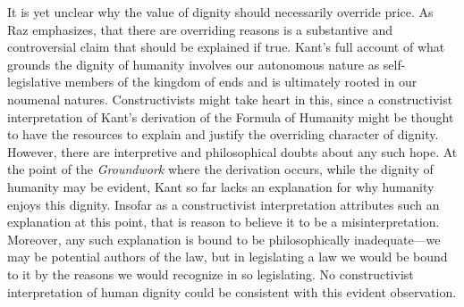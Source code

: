 \documentclass[12pt]{article}
\begin{document}
It is yet unclear why the value of dignity should necessarily override price. As Raz emphasizes, that there are overriding reasons is a substantive and controversial claim that should be explained if true. Kant's full account of what grounds the dignity of humanity involves our autonomous nature as self-le\-gis\-la\-tive members of the kingdom of ends and is ultimately rooted in our noumenal natures. Constructivists might take heart in this, since a constructivist interpretation of Kant's derivation of the Formula of Humanity might be thought to have the resources to explain and justify the overriding character of dignity. However, there are interpretive and philosophical doubts about any such hope. At the point of the \emph{Groundwork} where the derivation occurs, while the dignity of humanity may be evident, Kant so far lacks an explanation for why humanity enjoys this dignity. Insofar as a constructivist interpretation attributes such an explanation at this point, that is reason to believe it to be a misinterpretation. Moreover, any such explanation is bound to be philosophically inadequate---we may be potential authors of the law, but in legislating a law we would be bound to it by the reasons we would recognize in so legislating. No constructivist interpretation of human dignity could be consistent with this evident observation. 
\end{document}
